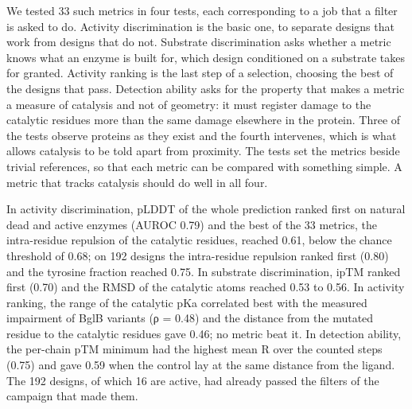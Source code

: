 \documentclass[
  10pt,
]{article}
\DeclareRobustCommand{\_}{\textunderscore\hspace{0pt}}
\begin{document}
We tested 33 such
metrics in four
tests, each
corresponding to a
job that a filter is
asked to do.
Activity
discrimination is
the basic one, to
separate designs
that work from
designs that do not.
Substrate
discrimination asks
whether a metric
knows what an enzyme
is built for, which
design conditioned
on a substrate takes
for granted.
Activity ranking is
the last step of a
selection, choosing
the best of the
designs that pass.
Detection ability
asks for the
property that makes
a metric a measure
of catalysis and not
of geometry: it must
register damage to
the catalytic
residues more than
the same damage
elsewhere in the
protein. Three of
the tests observe
proteins as they
exist and the fourth
intervenes, which is
what allows
catalysis to be told
apart from
proximity. The tests
set the metrics
beside trivial
references, so that
each metric can be
compared with
something simple. A
metric that tracks
catalysis should do
well in all four.

In activity
discrimination,
pLDDT of the whole
prediction ranked
first on natural
dead and active
enzymes (AUROC 0.79)
and the best of the
33 metrics, the
intra-residue
repulsion of the
catalytic residues,
reached 0.61, below
the chance threshold
of 0.68; on 192
designs the
intra-residue
repulsion ranked
first (0.80) and the
tyrosine fraction
reached 0.75. In
substrate
discrimination, ipTM
ranked first (0.70)
and the RMSD of the
catalytic atoms
reached 0.53 to
0.56. In activity
ranking, the range
of the catalytic pKa
correlated best with
the measured
impairment of BglB
variants (ρ = 0.48)
and the distance
from the mutated
residue to the
catalytic residues
gave 0.46; no metric
beat it. In
detection ability,
the per-chain pTM
minimum had the
highest mean R over
the counted steps
(0.75) and gave 0.59
when the control lay
at the same distance
from the ligand. The
192 designs, of
which 16 are active,
had already passed
the filters of the
campaign that made
them.



\end{document}
